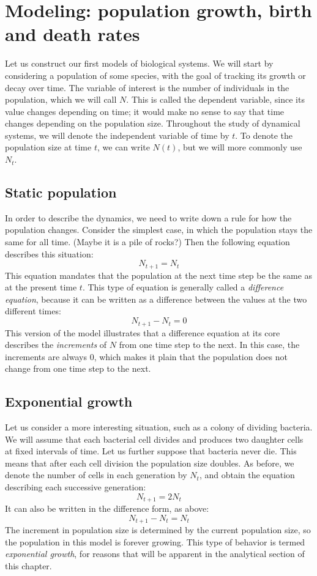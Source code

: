 \documentclass[11pt]{book}
\begin{document}
\section[Models of population growth]{Modeling: population growth, birth and death rates}
Let us construct our first models of biological systems. We will start by considering a population of some species, with the goal of tracking its growth or decay over time. The variable of interest is the number of individuals in the population, which we will call $N$. This is called the dependent variable, since its value changes depending on time; it would make no sense to say that time changes depending on the population size. Throughout the study of dynamical systems, we will denote the independent variable of time by $t$. To denote the population size at time $t$, we can write $N(t)$, but we will more commonly use $N_t$.

\subsection{Static population}
In order to describe the dynamics, we need to write down a rule for how the population changes. Consider the simplest case, in which the population stays the same for all time. (Maybe it is a pile of rocks?) Then the following equation describes this situation:
$$N_{t+1} = N_t $$
This equation mandates that the population at the next time step be the same as at the present time $t$. This type of equation is generally called a \emph{difference equation}, because it can be written as a difference between the values at the two different times:
$$N_{t+1} - N_t = 0$$
This version of the model illustrates that a difference equation at its core describes the \emph{increments} of $N$ from one time step to the next. In this case, the increments are always 0, which makes it plain that the population does not change from one time step to the next.
\subsection{Exponential growth}
Let us consider a more interesting situation, such as a colony of dividing bacteria. We will assume that each bacterial cell divides and produces two daughter cells at fixed intervals of time. Let us further suppose that bacteria never die. This means that after each cell division the population size doubles. As before,  we denote the number of cells in each generation by $N_t$, and obtain the equation describing each successive generation:
$$ N_{t+1} = 2N_t $$
It can also be written in the difference form, as above:
$$ N_{t+1} - N_t = N_t$$
The increment in population size is determined by the current population size, so the population in this model is forever growing. This type of behavior is termed \emph{exponential growth}, for reasons that will be apparent in the analytical section of this chapter.
\end{document}
